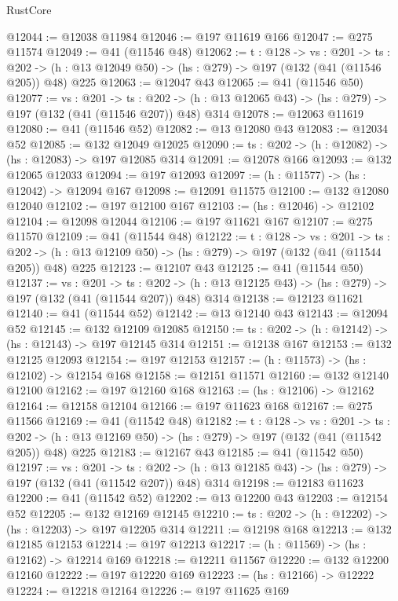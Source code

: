 \begin{lexlean}{RustCore}
\begin{coremodule}
@12044 := @12038 @11984
@12046 := @197 @11619 @166
@12047 := @275 @11574
@12049 := @41 (@11546 @48)
@12062 := {t : @128} ->
  {vs : @201} ->
  {ts : @202} -> (h : @13 @12049 @50) -> (hs : @279) -> @197 (@132 (@41 (@11546 @205)) @48) @225
@12063 := @12047 @43
@12065 := @41 (@11546 @50)
@12077 := {vs : @201} ->
  {ts : @202} -> (h : @13 @12065 @43) -> (hs : @279) -> @197 (@132 (@41 (@11546 @207)) @48) @314
@12078 := @12063 @11619
@12080 := @41 (@11546 @52)
@12082 := @13 @12080 @43
@12083 := @12034 @52
@12085 := @132 @12049 @12025
@12090 := {ts : @202} -> (h : @12082) -> (hs : @12083) -> @197 @12085 @314
@12091 := @12078 @166
@12093 := @132 @12065 @12033
@12094 := @197 @12093
@12097 := (h : @11577) -> (hs : @12042) -> @12094 @167
@12098 := @12091 @11575
@12100 := @132 @12080 @12040
@12102 := @197 @12100 @167
@12103 := (hs : @12046) -> @12102
@12104 := @12098 @12044
@12106 := @197 @11621 @167
@12107 := @275 @11570
@12109 := @41 (@11544 @48)
@12122 := {t : @128} ->
  {vs : @201} ->
  {ts : @202} -> (h : @13 @12109 @50) -> (hs : @279) -> @197 (@132 (@41 (@11544 @205)) @48) @225
@12123 := @12107 @43
@12125 := @41 (@11544 @50)
@12137 := {vs : @201} ->
  {ts : @202} -> (h : @13 @12125 @43) -> (hs : @279) -> @197 (@132 (@41 (@11544 @207)) @48) @314
@12138 := @12123 @11621
@12140 := @41 (@11544 @52)
@12142 := @13 @12140 @43
@12143 := @12094 @52
@12145 := @132 @12109 @12085
@12150 := {ts : @202} -> (h : @12142) -> (hs : @12143) -> @197 @12145 @314
@12151 := @12138 @167
@12153 := @132 @12125 @12093
@12154 := @197 @12153
@12157 := (h : @11573) -> (hs : @12102) -> @12154 @168
@12158 := @12151 @11571
@12160 := @132 @12140 @12100
@12162 := @197 @12160 @168
@12163 := (hs : @12106) -> @12162
@12164 := @12158 @12104
@12166 := @197 @11623 @168
@12167 := @275 @11566
@12169 := @41 (@11542 @48)
@12182 := {t : @128} ->
  {vs : @201} ->
  {ts : @202} -> (h : @13 @12169 @50) -> (hs : @279) -> @197 (@132 (@41 (@11542 @205)) @48) @225
@12183 := @12167 @43
@12185 := @41 (@11542 @50)
@12197 := {vs : @201} ->
  {ts : @202} -> (h : @13 @12185 @43) -> (hs : @279) -> @197 (@132 (@41 (@11542 @207)) @48) @314
@12198 := @12183 @11623
@12200 := @41 (@11542 @52)
@12202 := @13 @12200 @43
@12203 := @12154 @52
@12205 := @132 @12169 @12145
@12210 := {ts : @202} -> (h : @12202) -> (hs : @12203) -> @197 @12205 @314
@12211 := @12198 @168
@12213 := @132 @12185 @12153
@12214 := @197 @12213
@12217 := (h : @11569) -> (hs : @12162) -> @12214 @169
@12218 := @12211 @11567
@12220 := @132 @12200 @12160
@12222 := @197 @12220 @169
@12223 := (hs : @12166) -> @12222
@12224 := @12218 @12164
@12226 := @197 @11625 @169

\end{coremodule}
\end{lexlean}
